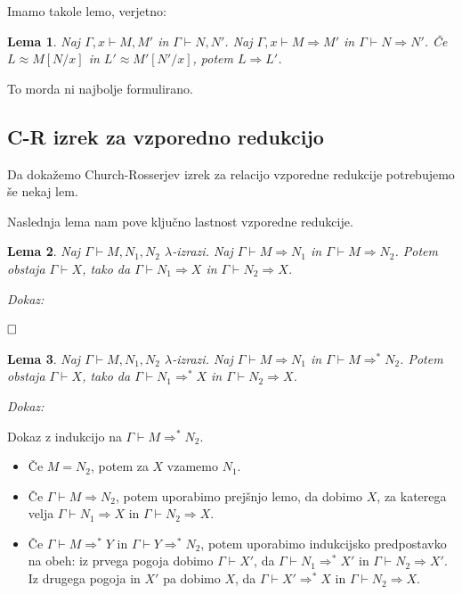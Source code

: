 \documentclass{article}
\def\qed{$\hfill\Box$}   %
\newtheorem{lema}{Lema}
\begin{document}
Imamo takole lemo, verjetno:

\begin{lema}
    Naj \(\Gamma, x \vdash M, M'\) in \(\Gamma \vdash N, N'\). Naj \(\Gamma, x \vdash M \Rightarrow M'\) in \(\Gamma \vdash N \Rightarrow N'\). Če \(L \approx M[N/x]\) in \(L' \approx M'[N'/x]\), potem \(L \Rightarrow L'\).
\end{lema}

To morda ni najbolje formulirano.


\subsection{C-R izrek za vzporedno redukcijo}

Da dokažemo Church-Rosserjev izrek za relacijo vzporedne redukcije potrebujemo še nekaj lem.

Naslednja lema nam pove ključno lastnost vzporedne redukcije.

\begin{lema}
    Naj \(\Gamma \vdash M, N_1, N_2\) \(\lambda\)-izrazi. Naj \(\Gamma \vdash M \Rightarrow N_1\) in \(\Gamma \vdash M \Rightarrow N_2\). Potem obstaja \(\Gamma \vdash X\), tako da \(\Gamma \vdash N_1 \Rightarrow X\) in \(\Gamma \vdash N_2 \Rightarrow X\).
\end{lema}

\noindent
{\em Dokaz:\/}

\qed

\begin{lema}
    Naj \(\Gamma \vdash M, N_1, N_2\) \(\lambda\)-izrazi. Naj \(\Gamma \vdash M \Rightarrow N_1\) in \(\Gamma \vdash M \Rightarrow^* N_2\). Potem obstaja \(\Gamma \vdash X\), tako da \(\Gamma \vdash N_1 \Rightarrow^* X\) in \(\Gamma \vdash N_2 \Rightarrow X\).
\end{lema}

\noindent
{\em Dokaz:\/}

Dokaz z indukcijo na \(\Gamma \vdash M \Rightarrow^* N_2\).

\begin{itemize}
    \item Če \(M = N_2\), potem za \(X\) vzamemo \(N_1\).
    \item Če \(\Gamma \vdash M \Rightarrow N_2\), potem uporabimo prejšnjo lemo, da dobimo \(X\), za katerega velja \(\Gamma \vdash N_1 \Rightarrow X\) in \(\Gamma \vdash N_2 \Rightarrow X\).
    \item Če \(\Gamma \vdash M \Rightarrow^* Y\) in \(\Gamma \vdash Y \Rightarrow^* N_2\), potem uporabimo indukcijsko predpostavko na obeh: iz prvega pogoja dobimo \(\Gamma \vdash X'\), da \(\Gamma \vdash N_1 \Rightarrow^* X'\) in \(\Gamma \vdash N_2 \Rightarrow X'\). Iz drugega pogoja in \(X'\) pa dobimo \(X\), da \(\Gamma \vdash X' \Rightarrow^* X\) in \(\Gamma \vdash N_2 \Rightarrow X\).
\end{itemize}
\end{document}
